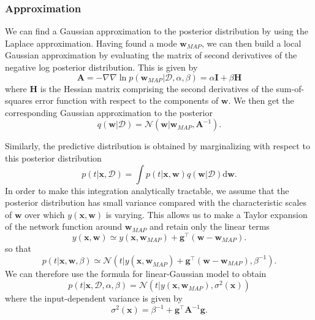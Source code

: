 \documentclass[a4paper]{book}
\newcommand{\ud}{\mathrm{d}}
\renewcommand{\bf}{\mathbf}
\renewcommand{\cal}{\mathcal}
\begin{document}
\subsubsection{Approximation}
We can find a Gaussian approximation to the posterior distribution by using the Laplace approximation. Having found a mode $\bf{w}_{MAP}$, we can then build a local Gaussian approximation by evaluating the matrix of second derivatives of the negative log posterior distribution. This is given by
\begin{equation}
	\bf{A} = -\nabla\nabla \ln p(\bf{w}_{MAP}|\cal{D},\alpha,\beta) = \alpha \bf{I} + \beta \bf{H}
\end{equation}
where $\bf{H}$ is the Hessian matrix comprising the second derivatives of the sum-of-squares error function with respect to the components of $\bf{w}$. We then get the corresponding Gaussian approximation to the posterior
\begin{equation}
	q(\bf{w}|\cal{D}) = \cal{N}(\bf{w}|\bf{w}_{MAP},\bf{A}^{-1}).
\end{equation}

Similarly, the predictive distribution is obtained by marginalizing with respect to this posterior distribution
\begin{equation}
	p(t|\bf{x},\cal{D}) = \int p(t|\bf{x,w})q(\bf{w}|\cal{D}) \ud \bf{w}.
\end{equation}
In order to make this integration analytically tractable, we assume that the posterior distribution has small variance compared with the characteristic scales of $\bf{w}$ over which $y(\bf{x,w})$ is varying. This allows us to make a Taylor expansion of the network function around $\bf{w}_{MAP}$ and retain only the linear terms
\begin{equation}
	y(\bf{x,w}) \simeq y(\bf{x},\bf{w}_{MAP}) + \bf{g}^{\intercal} (\bf{w}-\bf{w}_{MAP}).
\end{equation}
so that
\begin{equation}
	p(t|\bf{x,w},\beta) \simeq \cal{N}(t|y(\bf{x,w}_{MAP})+\bf{g}^{\intercal} (\bf{w-w}_{MAP}),\beta^{-1}).
\end{equation}
We can therefore use the formula for linear-Gaussian model to obtain
\begin{equation}
	p(t|\bf{x},\cal{D},\alpha,\beta) = \cal{N}(t|y(\bf{x},\bf{w}_{MAP}),\sigma^2(\bf{x}))
\end{equation}
where the input-dependent variance is given by
\begin{equation}
	\sigma^2(\bf{x}) = \beta^{-1} + \bf{g}^{\intercal} \bf{A}^{-1}\bf{g}.
\end{equation}
\end{document}
